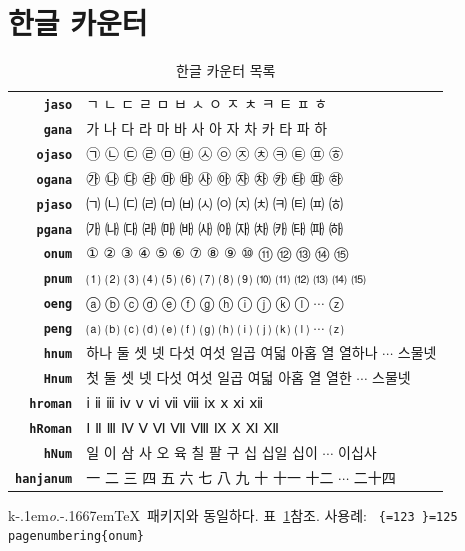 \documentclass[dvipdfmx,b5paper]{article}
\def\cs#1{\texttt{\color{teal}\char92 \chardef\{=123 \chardef\}=125 #1}}
\def\koTeX{\textsf{k}\kern-.1em\textit{o}.\kern-.1667em\TeX}
\begin{document}
\section{한글 카운터}

\begin{table}
    \centering
    \def\cs#1{\texttt{\bfseries #1}}
  \begin{tabular}{rl}\\
    \hline
    \cs{jaso}& ㄱ ㄴ ㄷ ㄹ ㅁ ㅂ ㅅ ㅇ ㅈ ㅊ ㅋ ㅌ ㅍ ㅎ\\
    \cs{gana}& 가 나 다 라 마 바 사 아 자 차 카 타 파 하\\
    \cs{ojaso}& ㉠ ㉡ ㉢ ㉣ ㉤ ㉥ ㉦ ㉧ ㉨ ㉩ ㉪ ㉫ ㉬ ㉭\\
    \cs{ogana}& ㉮ ㉯ ㉰ ㉱ ㉲ ㉳ ㉴ ㉵ ㉶ ㉷ ㉸ ㉹ ㉺ ㉻\\
    \cs{pjaso}& ㈀ ㈁ ㈂ ㈃ ㈄ ㈅ ㈆ ㈇ ㈈ ㈉ ㈊ ㈋ ㈌ ㈍\\
    \cs{pgana}& ㈎ ㈏ ㈐ ㈑ ㈒ ㈓ ㈔ ㈕ ㈖ ㈗ ㈘ ㈙ ㈚ ㈛\\
    \cs{onum}&  ① ② ③ ④ ⑤ ⑥ ⑦ ⑧ ⑨ ⑩ ⑪ ⑫ ⑬ ⑭ ⑮\\
    \cs{pnum}& ⑴ ⑵ ⑶ ⑷ ⑸ ⑹ ⑺ ⑻ ⑼ ⑽ ⑾ ⑿ ⒀ ⒁ ⒂\\
    \cs{oeng}& ⓐ ⓑ ⓒ ⓓ ⓔ ⓕ ⓖ ⓗ ⓘ ⓙ ⓚ ⓛ $\cdots$ ⓩ\\
    \cs{peng}& ⒜ ⒝ ⒞ ⒟ ⒠ ⒡ ⒢ ⒣ ⒤ ⒥ ⒦ ⒧ $\cdots$ ⒵\\
    \cs{hnum}& 하나 둘 셋 넷 다섯 여섯 일곱 여덟 아홉 열 열하나 $\cdots$ 스물넷\\
    \cs{Hnum}& 첫 둘 셋 넷 다섯 여섯 일곱 여덟 아홉 열 열한 $\cdots$ 스물넷\\
    \cs{hroman}& ⅰ ⅱ ⅲ ⅳ ⅴ ⅵ ⅶ ⅷ ⅸ ⅹ ⅺ ⅻ\\
    \cs{hRoman}& Ⅰ Ⅱ Ⅲ Ⅳ Ⅴ Ⅵ Ⅶ Ⅷ Ⅸ Ⅹ Ⅺ Ⅻ\\
    \cs{hNum}& 일 이 삼 사 오 육 칠 팔 구 십 십일 십이 $\cdots$ 이십사\\
    \cs{hanjanum}& 一 二 三 四 五 六 七 八 九 十 十一 十二 $\cdots$ 二十四\\
    \hline
  \end{tabular}
  \caption{한글 카운터 목록}\label{hangulcounters}
\end{table}

\koTeX\ 패키지와 동일하다.
표~\ref{hangulcounters}\를 참조.
사용례: \cs{pagenumbering\{onum\}}
\end{document}
